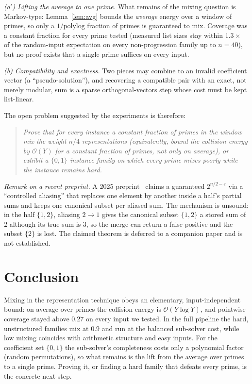 \documentclass[conference]{IEEEtran}
\newcommand{\Oh}{\mathcal{O}}
\begin{document}
\emph{(a$'$) Lifting the average to one prime.} What remains of the mixing
question is Markov-type: Lemma~\ref{lem:avg} bounds the \emph{average} energy
over a window of primes, so only a $1/\mathrm{polylog}$ fraction of primes is
guaranteed to mix. Coverage was a constant fraction for every prime tested
(measured list sizes stay within $1.3\times$ of the random-input expectation on
every non-progression family up to $n=40$), but no proof exists that a single
prime suffices on every input.

\emph{(b) Compatibility and exactness.} Two pieces may combine to an invalid
coefficient vector (a ``pseudo-solution''), and recovering a compatible pair with
an exact, not merely modular, sum is a sparse orthogonal-vectors step whose cost
must be kept list-linear.

The open problem suggested by the experiments is therefore:
\begin{quote}
\itshape
Prove that for every instance a constant fraction of primes in the window mix
the weight-$n/4$ representations (equivalently, bound the collision energy by
$\Oh(Y)$ for a constant fraction of primes, not only on average), or exhibit a
$\{0,1\}$ instance family on which every prime mixes poorly while the
instance remains hard.
\end{quote}

\emph{Remark on a recent preprint.} A 2025 preprint~\cite{salas} claims a
guaranteed $2^{n/2-\varepsilon}$ via a ``controlled aliasing'' that replaces one
element by another inside a half's partial sums and keeps one canonical subset
per aliased sum. The mechanism is unsound: in the half $\{1,2\}$, aliasing
$2\to1$ gives the canonical subset $\{1,2\}$ a stored sum of $2$ although its
true sum is $3$, so the merge can return a false positive and the subset
$\{2\}$ is lost. The claimed theorem is deferred to a companion paper and is not
established.

\section{Conclusion}
Mixing in the representation technique obeys an elementary, input-independent
bound: on average over primes the collision energy is $\Oh(Y\log Y)$, and
pointwise coverage stayed above $0.27$ on every input we tested. In the full
pipeline the hard, unstructured families mix at $0.9$ and run at the balanced
sub-solver cost, while low mixing coincides with arithmetic structure and easy
inputs. For the coefficient set $\{0,1\}$ the sub-solver's
completeness costs only a polynomial factor (random permutations), so what
remains is the lift from the average over primes to a single prime. Proving it,
or finding a hard family that defeats every prime, is the concrete next step.
\end{document}
